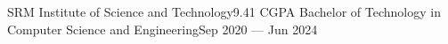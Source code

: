 \newHeading
{SRM Institute of Science and Technology}{9.41 CGPA}
{Bachelor of Technology in Computer Science and Engineering}{Sep 2020 --- Jun 2024}

\vspace{8pt}